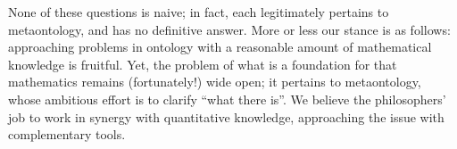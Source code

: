 None of these questions is naive; in fact, each legitimately pertains to metaontology, and has no definitive answer. More or less our stance is as follows: approaching problems in ontology with a reasonable amount of mathematical knowledge is fruitful. Yet, the problem of what is a foundation for that mathematics remains (fortunately!) wide open; it pertains to metaontology, whose ambitious effort is to clarify ``what there is''. We believe the philosophers' job to work in synergy with quantitative knowledge, approaching the issue with complementary tools.